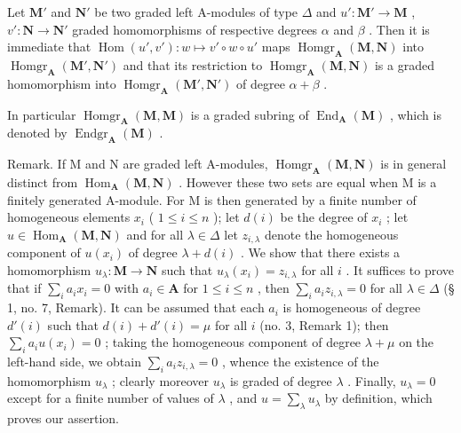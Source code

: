 Let \(\mathbf{M}'\) and \(\mathbf{N}'\) be two graded left A-modules of type \(\Delta\) and \(u':\mathbf{M}'\to\mathbf{M}\) , \(v':\mathbf{N}\to\mathbf{N}'\) graded homomorphisms of respective degrees \(\alpha\) and \(\beta\) . Then it is immediate that \(\operatorname{Hom}(u',v')\colon w\mapsto v'\circ w\circ u'\) maps \(\operatorname{Homgr}_{\mathbf{A}}(\mathbf{M},\mathbf{N})\) into \(\operatorname{Homgr}_{\mathbf{A}}(\mathbf{M}',\mathbf{N}')\) and that its restriction to \(\operatorname{Homgr}_{\mathbf{A}}(\mathbf{M},\mathbf{N})\) is a graded homomorphism into \(\operatorname{Homgr}_{\mathbf{A}}(\mathbf{M}',\mathbf{N}')\) of degree \(\alpha+\beta\) .

In particular \(\operatorname{Homgr}_{\mathbf{A}}(\mathbf{M}, \mathbf{M})\) is a graded subring of \(\operatorname{End}_{\mathbf{A}}(\mathbf{M})\) , which is denoted by \(\operatorname{Endgr}_{\mathbf{A}}(\mathbf{M})\) .

Remark. If M and N are graded left A-modules, \(\operatorname{Homgr}_{\mathbf{A}}(\mathbf{M}, \mathbf{N})\) is in general distinct from \(\operatorname{Hom}_{\mathbf{A}}(\mathbf{M}, \mathbf{N})\) . However these two sets are equal when M is a finitely generated A-module. For M is then generated by a finite number of homogeneous elements \(x_{i}\) ( \(1 \leqslant i \leqslant n\) ); let \(d(i)\) be the degree of \(x_{i}\) ; let \(u \in \operatorname{Hom}_{\mathbf{A}}(\mathbf{M}, \mathbf{N})\) and for all \(\lambda \in \Delta\) let \(z_{i,\lambda}\) denote the homogeneous component of \(u(x_{i})\) of degree \(\lambda + d(i)\) . We show that there exists a homomorphism \(u_{\lambda}: \mathbf{M} \to \mathbf{N}\) such that \(u_{\lambda}(x_{i}) = z_{i,\lambda}\) for all \(i\) . It suffices to prove that if \(\sum_{i} a_{i} x_{i} = 0\) with \(a_{i} \in \mathbf{A}\) for \(1 \leqslant i \leqslant n\) , then \(\sum_{i} a_{i} z_{i,\lambda} = 0\) for all \(\lambda \in \Delta\) (§ 1, no. 7, Remark). It can be assumed that each \(a_{i}\) is homogeneous of degree \(d'(i)\) such that \(d(i) + d'(i) = \mu\) for all \(i\) (no. 3, Remark 1); then \(\sum_{i} a_{i} u(x_{i}) = 0\) ; taking the homogeneous component of degree \(\lambda + \mu\) on the left-hand side, we obtain \(\sum_{i} a_{i} z_{i,\lambda} = 0\) , whence the existence of the homomorphism \(u_{\lambda}\) ; clearly moreover \(u_{\lambda}\) is graded of degree \(\lambda\) . Finally, \(u_{\lambda} = 0\) except for a finite number of values of \(\lambda\) , and \(u = \sum_{\lambda} u_{\lambda}\) by definition, which proves our assertion.

